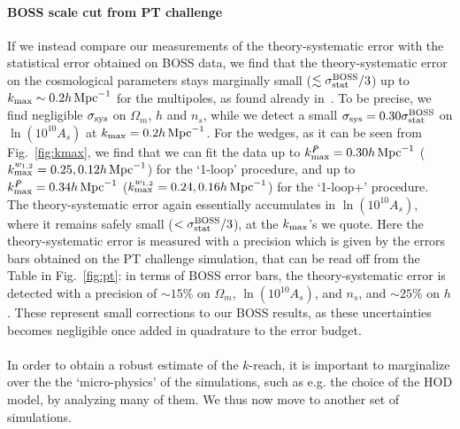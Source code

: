 \documentclass[12pt,a4paper]{article}
\def\hinvMpc{h\,{\rm Mpc}^{-1}}
\def\PA{\slashed{P}}
\renewcommand{\(}{\left(}
\renewcommand{\)}{\right)}
\begin{document}
{\paragraph{BOSS scale cut from PT challenge} If we instead compare our measurements of the theory-systematic error with the statistical error obtained on BOSS data, we find that the theory-systematic error on the cosmological parameters stays marginally small ($\lesssim \sigma_{\rm stat}^{\rm BOSS} / 3$) up to $k_{\rm max} \sim 0.2 \hinvMpc$ for the multipoles, as found already in~\cite{DAmico:2019fhj}. 
To be precise, we find negligible $\sigma_{\rm sys}$ on $\Omega_m$, $h$ and $n_s$, while we detect a small $\sigma_{\rm sys} = 0.30 \sigma_{\rm stat}^{\rm BOSS}$ on $\ln (10^{10} A_s)$ at $k_{\rm max} = 0.2 \hinvMpc$. 
For the wedges, as it can be seen from Fig.~\ref{fig:kmax}, we find that we can fit the data up to $k_{\rm max}^{\PA} = 0.30 \hinvMpc$ ($k_{\rm max}^{w_{1,2}} = 0.25, 0.12 \hinvMpc$) for the `1-loop' procedure, and up to $k_{\rm max}^{\PA} = 0.34 \hinvMpc$ ($k_{\rm max}^{w_{1,2}} = 0.24, 0.16 \hinvMpc$) for the `1-loop+' procedure. 
The theory-systematic error again essentially accumulates in $\ln (10^{10} A_s)$, where it remains safely small ($<\sigma_{\rm stat}^{\rm BOSS} / 3$), at the $k_{\rm max}$'s we quote. Here the theory-systematic error is measured with a precision which is given by the errors bars obtained on the PT challenge simulation, that can be read off from the Table in Fig.~\ref{fig:pt}: in terms of BOSS error bars, the theory-systematic error is detected with a precision of $\sim 15\%$ on $\Omega_m$, $\ln(10^{10}A_s)$, and $n_s$, and $\sim 25\%$ on $h$. 
These represent small corrections to our BOSS results, as these uncertainties becomes negligible once added in quadrature to the error budget. 

\paragraph{} In order to obtain a robust estimate of the $k$-reach, it is important to marginalize over the the `micro-physics' of the simulations, such as e.g. the choice of the HOD model, by analyzing many of them. 
We thus now move to another set of simulations. 

}
\end{document}
